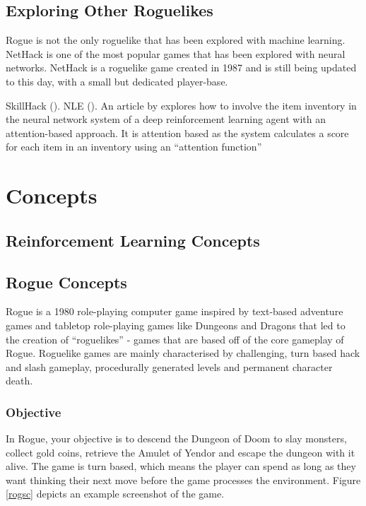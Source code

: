 \documentclass[11pt,a4paper]{article}
\begin{document}
\subsection{Exploring Other Roguelikes}
Rogue is not the only roguelike that has been explored with machine learning. NetHack is one of the most popular games that has been explored with neural networks. NetHack is a roguelike game created in 1987 and is still being updated to this day, with a small but dedicated player-base.

SkillHack (\cite{matthews22}).
NLE (\cite{kuttler20}).
An article by \cite{izumiya21} explores how to involve the item inventory in the neural network system of a deep reinforcement learning agent with an attention-based approach. It is attention based as the system calculates a score for each item in an inventory using an ``attention function''

\section{Concepts}
\subsection{Reinforcement Learning Concepts}

\subsection{Rogue Concepts}
Rogue is a 1980 role-playing computer game inspired by text-based adventure games and tabletop role-playing games like Dungeons and Dragons that led to the creation of ``roguelikes'' - games that are based off of the core gameplay of Rogue. Roguelike games are mainly characterised by challenging, turn based hack and slash gameplay, procedurally generated levels and permanent character death.

\subsubsection{Objective}
In Rogue, your objective is to descend the Dungeon of Doom to slay monsters, collect gold coins, retrieve the Amulet of Yendor and escape the dungeon with it alive. The game is turn based, which means the player can spend as long as they want thinking their next move before the game processes the environment. Figure \ref{rogsc} depicts an example screenshot of the game.
\end{document}
